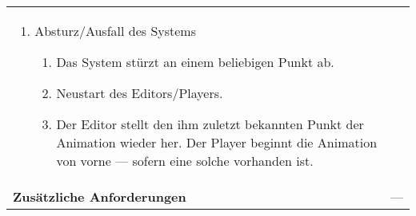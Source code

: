 \begin{longtabu}{p{0.5\textwidth}p{0.5\textwidth}}
        \begin{enumerate}[label= (\alph*)]
            \item{Absturz/Ausfall des Systems
                \begin{enumerate}[label= (\roman*)]
                        \item{Das System stürzt an einem beliebigen Punkt
                                ab.}
                        \item{Neustart des Editors/Players.}
                        \item{Der Editor stellt den ihm zuletzt bekannten
                                Punkt der Animation wieder her. Der Player
                            beginnt die Animation von vorne --- sofern eine
                        solche vorhanden ist.}
                \end{enumerate}
            } \end{enumerate}
        \\
    \cmidrule(r){1-1}\cmidrule(lr){2-2}
        \textbf{Zusätzliche Anforderungen} &
        --- \\
    \bottomrule
\end{longtabu}
